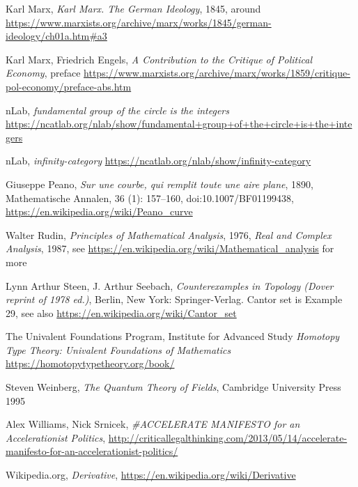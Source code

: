 \documentclass{article}
\begin{document}
\begin{thebibliography}{99}
 Karl Marx, \textit{Karl Marx. The German Ideology}, 1845, around \url{https://www.marxists.org/archive/marx/works/1845/german-ideology/ch01a.htm#a3}

 Karl Marx, Friedrich Engels, \textit{A Contribution to the Critique of Political Economy}, preface \url{https://www.marxists.org/archive/marx/works/1859/critique-pol-economy/preface-abs.htm}

 nLab, \textit{fundamental group of the circle is the integers} \url{https://ncatlab.org/nlab/show/fundamental+group+of+the+circle+is+the+integers}

 nLab, \textit{infinity-category} \url{https://ncatlab.org/nlab/show/infinity-category}

 Giuseppe Peano, \textit{Sur une courbe, qui remplit toute une aire plane}, 1890, Mathematische Annalen, 36 (1): 157–160, doi:10.1007/BF01199438, \url{https://en.wikipedia.org/wiki/Peano_curve}

 Walter Rudin, \textit{Principles of Mathematical Analysis}, 1976, \textit{Real and Complex Analysis}, 1987, see \url{https://en.wikipedia.org/wiki/Mathematical_analysis} for more

 Lynn Arthur Steen, J. Arthur Seebach, \textit{Counterexamples in Topology (Dover reprint of 1978 ed.)}, Berlin, New York: Springer-Verlag. Cantor set is Example 29, see also \url{https://en.wikipedia.org/wiki/Cantor_set}


 The Univalent Foundations Program,
Institute for Advanced Study \textit{Homotopy Type Theory:
Univalent Foundations of Mathematics} \url{https://homotopytypetheory.org/book/}

 Steven Weinberg, \textit{The Quantum Theory of Fields}, Cambridge University Press 1995

 Alex Williams, Nick Srnicek, \textit{\#ACCELERATE MANIFESTO for an Accelerationist Politics}, \url{http://criticallegalthinking.com/2013/05/14/accelerate-manifesto-for-an-accelerationist-politics/}



 Wikipedia.org, \textit{Derivative}, \url{https://en.wikipedia.org/wiki/Derivative}

\end{thebibliography}
\end{document}
